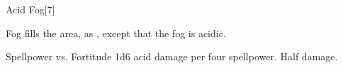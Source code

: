 \begin{spellsection}{Acid Fog}[7]
    \begin{spellheader}
    \end{spellheader}
    \begin{spellcontent}
        \begin{spelltargetinginfo}
        \end{spelltargetinginfo}
        \begin{spelleffects}
            \spelleffect Fog fills the area, as , except that the fog is acidic.
            \spelldur \durshort
        \end{spelleffects}
    \end{spellcontent}
    \begin{spellsubcontent}
        \begin{spelltargetinginfo}
        \end{spelltargetinginfo}
        \begin{spelleffects}
            \begin{spellattack}{Spellpower vs. Fortitude}
                \spellsuccess 1d6 acid damage per four spellpower.
                \spellfailure Half damage.
            \end{spellattack}
        \end{spelleffects}
    \end{spellsubcontent}
    \begin{spellfooter}
        \spellnotes \physicalspellnotes
        \miscastyou
    \end{spellfooter}
\end{spellsection}

